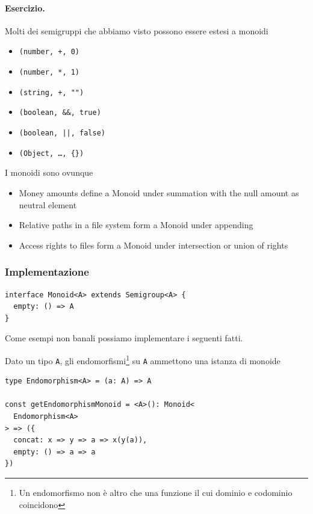 \documentclass[12pt]{article}
\begin{document}
\paragraph{Esercizio.} Molti dei semigruppi che abbiamo visto possono essere estesi a monoidi

\begin{itemize}
  \item \texttt{(number, +, 0)}
  \item \texttt{(number, *, 1)}
  \item \texttt{(string, +, "")}
  \item \texttt{(boolean, \&\&, true)}
  \item \texttt{(boolean, ||, false)}
  \item \texttt{(Object, \ldots, \{\})}
\end{itemize}

I monoidi sono ovunque

\begin{itemize}
  \item Money amounts define a Monoid under summation with the null amount as neutral element
  \item Relative paths in a file system form a Monoid under appending
  \item Access rights to files form a Monoid under intersection or union of rights
\end{itemize}

\subsubsection{Implementazione}

\begin{verbatim}
interface Monoid<A> extends Semigroup<A> {
  empty: () => A
}
\end{verbatim}

Come esempi non banali possiamo implementare i seguenti fatti.

Dato un tipo \texttt{A}, gli endomorfismi\footnote{Un endomorfismo non è altro che una funzione il cui dominio e codominio coincidono}
su \texttt{A} ammettono una istanza di monoide

\begin{verbatim}
type Endomorphism<A> = (a: A) => A

const getEndomorphismMonoid = <A>(): Monoid<
  Endomorphism<A>
> => ({
  concat: x => y => a => x(y(a)),
  empty: () => a => a
})
\end{verbatim}
\end{document}
